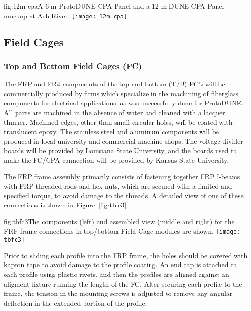 \begin{dunefigure}{fig:12m-cpa}{A 6 m ProtoDUNE CPA-Panel and a 12 m DUNE CPA-Panel mockup at Ash River.}
\texttt{[image: 12m-cpa]}
\end{dunefigure}

\subsection{Field Cages}
\label{sec:fdsp-hv-prod-fc}



\subsubsection{Top and Bottom Field Cages (FC)}

The FRP and FR4 components of the top and bottom (T/B) FC's will be commercially produced by firms which specialize in the machining of fiberglass components for electrical applications, as was successfully done for ProtoDUNE. All parts are machined in the absence of water and cleaned with a lacquer thinner. Machined edges, other than small circular holes, will be coated with translucent epoxy. The stainless steel and aluminum components will be produced in local university and commercial machine shops. The voltage divider boards will be provided by Louisiana State University, and the boards used to make the FC/CPA connection will be provided by Kansas State University.

The FRP frame assembly primarily consists of fastening together FRP I-beams with FRP threaded rods and hex nuts, which are secured with a limited and specified torque, to avoid damage to the threads. A detailed view of one of these connections is shown in Figure~\ref{fig:tbfc3}.

\begin{dunefigure}{fig:tbfc3}{The components (left) and assembled view (middle and right) for the FRP frame connections in top/bottom Field Cage modules are shown.}
\texttt{[image: tbfc3]}
\end{dunefigure}

Prior to sliding each profile into the FRP frame, the holes should be covered with kapton tape to avoid damage to the profile coating. An end cap is attached to each profile using plastic rivets, and then the profiles are aligned against an aligment fixture running the length of the FC. After securing each profile to the frame, the tension in the mounting screws is adjusted to remove any angular deflection in the extended portion of the profile.

